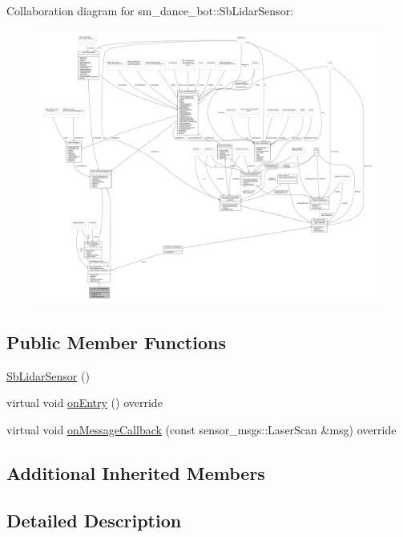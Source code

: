 Collaboration diagram for sm\+\_\+dance\+\_\+bot\+:\+:Sb\+Lidar\+Sensor\+:
\nopagebreak
\begin{figure}[H]
\begin{center}
\leavevmode
\includegraphics[width=350pt]{structsm__dance__bot_1_1SbLidarSensor__coll__graph}
\end{center}
\end{figure}
\subsection*{Public Member Functions}
\begin{DoxyCompactItemize}
\item 
\hyperlink{structsm__dance__bot_1_1SbLidarSensor_ab1ba764c5f5e6e8b0f24a84918a188cf}{Sb\+Lidar\+Sensor} ()
\item 
virtual void \hyperlink{structsm__dance__bot_1_1SbLidarSensor_ac38f11a8a77f8a14cf2c780a8ff20f4a}{on\+Entry} () override
\item 
virtual void \hyperlink{structsm__dance__bot_1_1SbLidarSensor_a12bb8b4a9e2a9dd4d77c0e9f51762f8f}{on\+Message\+Callback} (const sensor\+\_\+msgs\+::\+Laser\+Scan \&msg) override
\end{DoxyCompactItemize}
\subsection*{Additional Inherited Members}


\subsection{Detailed Description}


